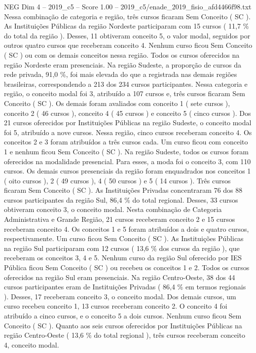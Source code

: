 \begin{textsample}{NEG Dim 4 – 2019\_c5 – Score 1.00 – 2019\_c5/enade\_2019\_fisio\_afd4466f98.txt}
Nessa combinação de categoria e região, três cursos ficaram Sem Conceito ( SC ).
As Instituições Públicas da região Nordeste participaram com 15 cursos ( 11,7 \% do total da região ).
Desses, 11 obtiveram conceito 5, o valor modal, seguidos por outros quatro cursos que receberam conceito 4.
Nenhum curso ficou Sem Conceito ( SC ) ou com os demais conceitos nessa região.
Todos os cursos oferecidos na região Nordeste eram presenciais.
Na região Sudeste, a proporção de cursos da rede privada, 91,0 \%, foi mais elevada do que a registrada nas demais regiões brasileiras, correspondendo a 213 dos 234 cursos participantes.
Nessa categoria e região, o conceito modal foi 3, atribuído a 107 cursos e, três cursos ficaram Sem Conceito ( SC ).
Os demais foram avaliados com conceito 1 ( sete cursos ), conceito 2 ( 46 cursos ), conceito 4 ( 45 cursos ) e conceito 5 ( cinco cursos ).
Dos 21 cursos oferecidos por Instituições Públicas na região Sudeste, o conceito modal foi 5, atribuído a nove cursos.
Nessa região, cinco cursos receberam conceito 4.
Os conceitos 2 e 3 foram atribuídos a três cursos cada.
Um curso ficou com conceito 1 e nenhum ficou Sem Conceito ( SC ).
Na região Sudeste, todos os cursos foram oferecidos na modalidade presencial.
Para esses, a moda foi o conceito 3, com 110 cursos.
Os demais cursos presenciais da região foram enquadrados nos conceitos 1 ( oito cursos ), 2 ( 49 cursos ), 4 ( 50 cursos ) e 5 ( 14 cursos ).
Três cursos ficaram Sem Conceito ( SC ).
As Instituições Privadas concentraram 76 dos 88 cursos participantes da região Sul, 86,4 \% do total regional.
Desses, 33 cursos obtiveram conceito 3, o conceito modal.
Nesta combinação de Categoria Administrativa e Grande Região, 21 cursos receberam conceito 2 e 15 cursos receberam conceito 4.
Os conceitos 1 e 5 foram atribuídos a dois e quatro cursos, respectivamente.
Um curso ficou Sem Conceito ( SC ).
As Instituições Públicas na região Sul participaram com 12 cursos ( 13,6 \% dos cursos da região ), que receberam os conceitos 3, 4 e 5.
Nenhum curso da região Sul oferecido por IES Pública ficou Sem Conceito ( SC ) ou recebeu os conceitos 1 e 2.
Todos os cursos oferecidos na região Sul eram presenciais.
Na região Centro-Oeste, 38 dos 44 cursos participantes eram de Instituições Privadas ( 86,4 \% em termos regionais ).
Desses, 17 receberam conceito 3, o conceito modal.
Dos demais cursos, um curso recebeu conceito 1, 13 cursos receberam conceito 2.
O conceito 4 foi atribuído a cinco cursos, e o conceito 5 a dois cursos.
Nenhum curso ficou Sem Conceito ( SC ).
Quanto aos seis cursos oferecidos por Instituições Públicas na região Centro-Oeste ( 13,6 \% do total regional ), três cursos receberam conceito 4, conceito modal.

\end{textsample}
